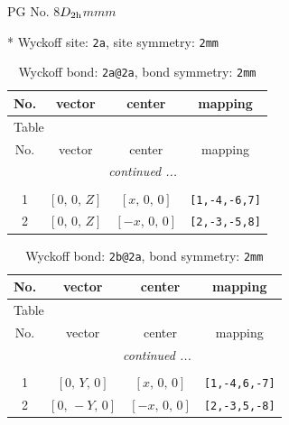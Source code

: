 \documentclass[fleqn,8pt]{jsarticle}
\begin{document}
\setcounter{MaxMatrixCols}{32}

\renewcommand{\tablename}{Table~}
\renewcommand{\figurename}{Figure~}
\begin{center}
\LARGE
PG No. 8\quad$D_{\rm 2h}$\quad$mmm$\quad[ orthorhombic ]
\end{center}


* Wyckoff site: {\tt 2a}, site symmetry: {\tt 2mm}
\renewcommand{\arraystretch}{1.2}
\begin{longtable}{cccc}
\caption{Wyckoff bond: {\tt 2a@2a}, bond symmetry: {\tt 2mm}}
 \\
 \hline \hline
No. & vector & center & mapping \\ \hline \endfirsthead

\multicolumn{3}{l}{\tablename\ \thetable{}} \\
 \hline \hline
No. & vector & center & mapping \\ \hline \endhead

 \hline \hline
\multicolumn{3}{r}{\footnotesize\it continued ...} \\ \endfoot

 \hline \hline
\multicolumn{3}{r}{} \\ \endlastfoot

1 & $\left[ 0,\, 0,\, Z \right]$ & $\left[ x,\, 0,\, 0 \right]$ & {\tt [1,-4,-6,7]} \\ \hline
2 & $\left[ 0,\, 0,\, Z \right]$ & $\left[ - x,\, 0,\, 0 \right]$ & {\tt [2,-3,-5,8]} \\
\end{longtable}
\renewcommand{\arraystretch}{1.2}
\begin{longtable}{cccc}
\caption{Wyckoff bond: {\tt 2b@2a}, bond symmetry: {\tt 2mm}}
 \\
 \hline \hline
No. & vector & center & mapping \\ \hline \endfirsthead

\multicolumn{3}{l}{\tablename\ \thetable{}} \\
 \hline \hline
No. & vector & center & mapping \\ \hline \endhead

 \hline \hline
\multicolumn{3}{r}{\footnotesize\it continued ...} \\ \endfoot

 \hline \hline
\multicolumn{3}{r}{} \\ \endlastfoot

1 & $\left[ 0,\, Y,\, 0 \right]$ & $\left[ x,\, 0,\, 0 \right]$ & {\tt [1,-4,6,-7]} \\ \hline
2 & $\left[ 0,\, - Y,\, 0 \right]$ & $\left[ - x,\, 0,\, 0 \right]$ & {\tt [2,-3,5,-8]} \\
\end{longtable}
\end{document}
